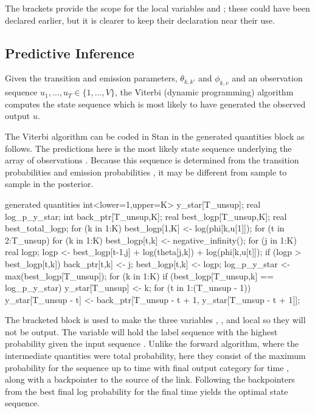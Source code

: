 The brackets provide the scope for the local variables  and
; these could have been declared earlier, but it is
clearer to keep their declaration near their use. 


\subsection{Predictive Inference}

Given the transition and emission parameters, $\theta_{k,k'}$ and
$\phi_{k,v}$ and an observation sequence $u_1,\ldots,u_T \in \{
1,\ldots,V \}$, the Viterbi (dynamic programming) algorithm
computes the state sequence which is most likely to have generated the
observed output $u$.  

The Viterbi algorithm can be coded in Stan in the generated quantities
block as follows.  The predictions here is the most likely state
sequence  underlying the
array of observations .  Because this
sequence is determined from the transition probabilities
 and emission probabilities , it may be
different from sample to sample in the posterior.
%
\begin{stancode}
generated quantities {
  int<lower=1,upper=K> y_star[T_unsup];
  real log_p_y_star;
  { 
    int back_ptr[T_unsup,K];
    real best_logp[T_unsup,K];
    real best_total_logp;
    for (k in 1:K)
      best_logp[1,K] <- log(phi[k,u[1]]);
    for (t in 2:T_unsup) {
      for (k in 1:K) {
        best_logp[t,k] <- negative_infinity();
        for (j in 1:K) {
          real logp;
          logp <- best_logp[t-1,j] 
                  + log(theta[j,k]) + log(phi[k,u[t]]);
          if (logp > best_logp[t,k]) {
            back_ptr[t,k] <- j;
            best_logp[t,k] <- logp;
          }
        }
      }
    }
    log_p_y_star <- max(best_logp[T_unsup]);
    for (k in 1:K)
      if (best_logp[T_unsup,k] == log_p_y_star)
        y_star[T_unsup] <- k;
    for (t in 1:(T_unsup - 1))
      y_star[T_unsup - t] <- back_ptr[T_unsup - t + 1, 
                                      y_star[T_unsup - t + 1]];
  }
}
\end{stancode}
%
The bracketed block is used to make the three variables
, , and 
local so they will not be output.  The variable  will
hold the label sequence with the highest probability given the input
sequence .  Unlike the forward algorithm, where the
intermediate quantities were total probability, here they consist of
the maximum probability  for the sequence up to
time  with final output category  for time ,
along with a backpointer to the source of the link.  Following the
backpointers from the best final log probability for the final time
 yields the optimal state sequence.

